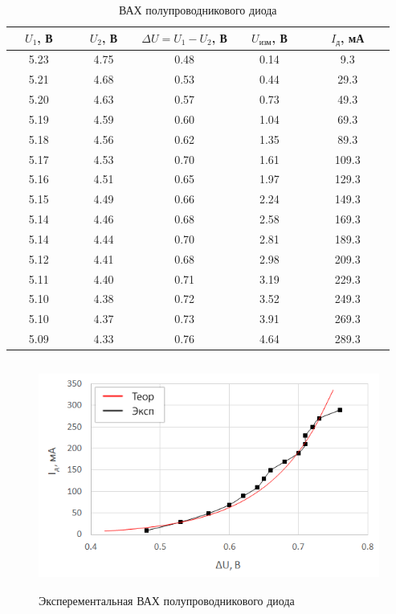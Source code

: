 \begin{table}[H]
	\begin{center}
	\caption{ВАХ полупроводникового диода}
	\def\arraystretch{1.2}
		\begin{tabular}{|c|c|c|c|c|}
		\hline 
		\ \ $U_1$, В\ \  & \ \ $U_2$, В\ \  & $\Delta U = U_1 - U_2$, В & \ \ $U_\text{изм}$, В\ \  & \ \ \ $I_\text{д}$, мА\ \ \ \\ 
		\hline 
		5.23 & 4.75 & 0.48 & 0.14 & 9.3 \\ 
		\hline 
		5.21 & 4.68 & 0.53 & 0.44 & 29.3 \\ 
		\hline 
		5.20 & 4.63 & 0.57 & 0.73 & 49.3 \\ 
		\hline 
		5.19 & 4.59 & 0.60 & 1.04 & 69.3 \\ 
		\hline 
		5.18 & 4.56 & 0.62 & 1.35 & 89.3 \\ 
		\hline 
		5.17 & 4.53 & 0.70 & 1.61 & 109.3 \\ 
		\hline 
		5.16 & 4.51 & 0.65 & 1.97 & 129.3 \\ 
		\hline 
		5.15 & 4.49 & 0.66 & 2.24 & 149.3 \\ 
		\hline 
		5.14 & 4.46 & 0.68 & 2.58 & 169.3 \\ 
		\hline 
		5.14 & 4.44 & 0.70 & 2.81 & 189.3 \\ 
		\hline 
		5.12 & 4.41 & 0.68 & 2.98 & 209.3 \\ 
		\hline 
		5.11 & 4.40 & 0.71 & 3.19 & 229.3 \\ 
		\hline 
		5.10 & 4.38 & 0.72 & 3.52 & 249.3 \\ 
		\hline 
		5.10 & 4.37 & 0.73 & 3.91 & 269.3 \\ 
		\hline 
		5.09 & 4.33 & 0.76 & 4.64 & 289.3 \\ 
		\hline 
		\end{tabular} 
		\label{tab:5:1}
	\end{center}
\end{table}

\begin{figure}[H]
	\begin{center}
		\includegraphics[height=7.5cm]{img/1}
		\caption{Эксперементальная ВАХ полупроводникового диода}
		\label{g:1} %
	\end{center}
\end{figure}

